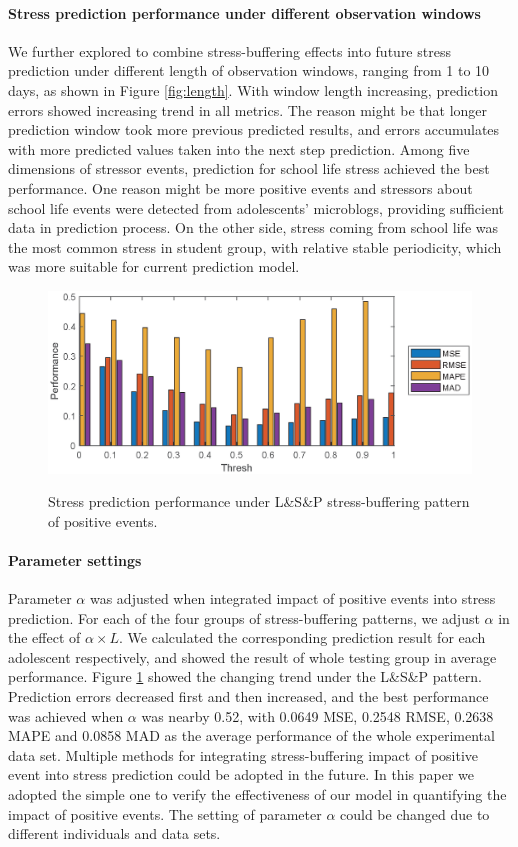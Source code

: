 \paragraph{Stress prediction performance under different observation windows}
We further explored to combine stress-buffering effects into future stress prediction under different length of observation windows, ranging from 1 to 10 days, as shown in Figure \ref{fig:length}.
With window length increasing,
prediction errors showed increasing trend in all metrics.
The reason might be that longer prediction window took more previous predicted results,
and errors accumulates with more predicted values taken into the next step prediction.
Among five dimensions of stressor events,
prediction for school life stress achieved the best performance.
One reason might be more positive events and stressors about school life events were detected from adolescents' microblogs,
providing sufficient data in prediction process.
On the other side,
stress coming from school life was the most common stress in student group,
with relative stable periodicity,
which was more suitable for current prediction model.


\begin{figure}
\centering
\caption{Stress prediction performance under L\&S\&P stress-buffering pattern of positive events.}
\includegraphics[width=\linewidth]{figs/thresh.eps}
\label{fig:thresh}
\end{figure}

\paragraph{Parameter settings}
Parameter $\alpha$ was adjusted when integrated impact of positive events into stress prediction.
For each of the four groups of stress-buffering patterns,
we adjust $\alpha$ in the effect of $\alpha \times L$.
We calculated the corresponding prediction result for each adolescent respectively,
and showed the result of whole testing group in average performance.
Figure \ref{fig:thresh} showed the changing trend under the L\&S\&P pattern.
Prediction errors decreased first and then increased,
and the best performance was achieved when $\alpha$ was nearby 0.52,
with 0.0649 MSE, 0.2548 RMSE, 0.2638 MAPE and 0.0858 MAD as the average performance of the whole experimental data set.
Multiple methods for integrating stress-buffering impact of positive event into stress prediction could be adopted in the future.
In this paper we adopted the simple one to verify the effectiveness of our model in quantifying the impact of positive events.
The setting of parameter $\alpha$ could be changed due to different individuals and data sets.
